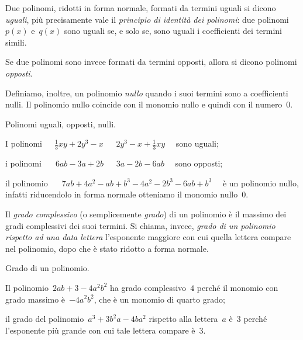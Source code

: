 \begin{definizione}
Due polinomi, ridotti in forma normale, formati da termini uguali si dicono \emph{uguali}, più precisamente vale il \emph{principio di identità dei polinomi}:
due polinomi~$p(x)$ e~$q(x)$ sono uguali se, e solo se, sono uguali
i coefficienti dei termini simili.

Se due polinomi sono invece formati da termini opposti, allora si dicono polinomi \emph{opposti}.

Definiamo, inoltre, un polinomio \emph{nullo} quando i suoi termini sono a coefficienti nulli. Il polinomio nullo
coincide con il monomio nullo e quindi con il numero~0.
\end{definizione}

\begin{exrig}
\begin{esempio}
Polinomi uguali, opposti, nulli.
\begin{enumeratea}
\item I polinomi~$\quad \frac{1}{3}xy+2y^3-x$ $\quad~2y^3-x+\frac{1}{3}xy \quad$ sono uguali;
\item i polinomi~$\quad~6ab-3a+2b$ $\quad~3a-2b-6ab \quad$ sono opposti;
\item il polinomio~$\quad~7ab+4a^2-ab+b^3-4a^2-2b^3-6ab+b^3 \quad$ è un polinomio nullo, infatti riducendolo in forma normale otteniamo il monomio nullo~$0$.
\end{enumeratea}
\end{esempio}
\end{exrig}

\begin{definizione}
Il \emph{grado complessivo} (o semplicemente \emph{grado}) di un polinomio è il massimo dei gradi complessivi dei suoi
termini. Si chiama, invece, \emph{grado di un polinomio rispetto ad una data lettera} l'esponente maggiore con
cui quella lettera compare nel polinomio, dopo che è stato ridotto a forma normale.
\end{definizione}

\begin{exrig}
\begin{esempio} Grado di un polinomio.
\begin{itemize*}
\item Il polinomio~$2ab+3-4a^2b^2$ ha grado complessivo~$4$ perché il monomio con grado massimo è~$-4a^2b^2 $, che è un monomio di quarto grado;
\item il grado del polinomio~$a^3+3b^2a-4ba^2$ rispetto alla lettera~$a$ è~$3$ perché l'esponente più grande con cui tale lettera compare è~$3$.
\end{itemize*}
\end{esempio}
\end{exrig}

